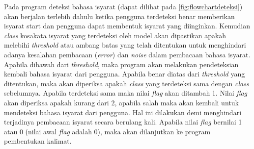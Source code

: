Pada program deteksi bahasa isyarat (dapat dilihat pada \ref{fig:flowchartdeteksi}) akan berjalan terlebih dahulu ketika pengguna terdeteksi benar memberikan isyarat start dan pengguna dapat membentuk isyarat yang diinginkan. Kemudian \textit{class} kosakata isyarat yang terdeteksi oleh model akan dipastikan apakah melebihi \textit{threshold} atau ambang batas yang telah ditentukan untuk menghindari adanya kesalahan pembacaan (\textit{error}) dan \textit{noise} dalam pembacaan bahasa isyarat. Apabila dibawah dari \textit{threshold}, maka program akan melakukan pendeteksian kembali bahasa isyarat dari pengguna. Apabila benar diatas dari \textit{threshold} yang ditentukan, maka akan diperiksa apakah \textit{class} yang terdeteksi sama dengan \textit{class} sebelumnya. Apabila terdeteksi sama maka nilai \textit{flag} akan ditambah 1. Nilai \textit{flag} akan diperiksa apakah kurang dari 2, apabila salah maka akan kembali untuk mendeteksi bahasa isyarat dari pengguna. Hal ini dilakukan demi menghindari terjadinya pembacaan isyarat secara berulang kali. Apabila nilai \textit{flag} bernilai 1 atau 0 (nilai awal \textit{flag} adalah 0), maka akan dilanjutkan ke program pembentukan kalimat.

